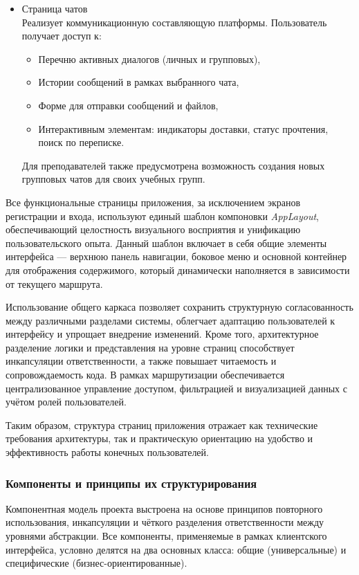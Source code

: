 \begin{itemize}
  \item Страница чатов\\
  Реализует коммуникационную составляющую платформы. Пользователь получает доступ к:
  \begin{itemize}
    \item Перечню активных диалогов (личных и групповых),
    \item Истории сообщений в рамках выбранного чата,
    \item Форме для отправки сообщений и файлов,
    \item Интерактивным элементам: индикаторы доставки, статус прочтения, поиск по переписке.
  \end{itemize}
  Для преподавателей также предусмотрена возможность создания новых групповых чатов для своих учебных групп.
\end{itemize}

Все функциональные страницы приложения, за исключением экранов регистрации и входа, используют единый шаблон компоновки \textit{AppLayout}, обеспечивающий целостность визуального восприятия и унификацию пользовательского опыта. Данный шаблон включает в себя общие элементы интерфейса — верхнюю панель навигации, боковое меню и основной контейнер для отображения содержимого, который динамически наполняется в зависимости от текущего маршрута.

Использование общего каркаса позволяет сохранить структурную согласованность между различными разделами системы, облегчает адаптацию пользователей к интерфейсу и упрощает внедрение изменений. Кроме того, архитектурное разделение логики и представления на уровне страниц способствует инкапсуляции ответственности, а также повышает читаемость и сопровождаемость кода. В рамках маршрутизации обеспечивается централизованное управление доступом, фильтрацией и визуализацией данных с учётом ролей пользователей.

Таким образом, структура страниц приложения отражает как технические требования архитектуры, так и практическую ориентацию на удобство и эффективность работы конечных пользователей.

\subsubsection{Компоненты и принципы их структурирования}

Компонентная модель проекта выстроена на основе принципов повторного использования, инкапсуляции и чёткого разделения ответственности между уровнями абстракции. Все компоненты, применяемые в рамках клиентского интерфейса, условно делятся на два основных класса: общие (универсальные) и специфические (бизнес-ориентированные).


